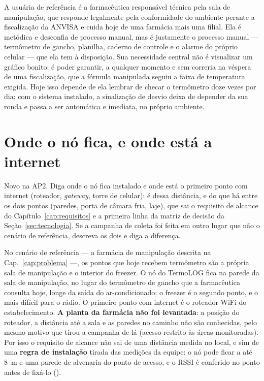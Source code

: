 A usuária de referência é a farmacêutica responsável técnica pela sala
de manipulação, que responde legalmente pela conformidade do ambiente
perante a fiscalização da ANVISA e cuida hoje de uma farmácia mais uma
filial. Ela é metódica e desconfia de processo manual, mas é justamente
o processo manual --- termômetro de gancho, planilha, caderno de
controle e o alarme do próprio celular --- que ela tem à disposição.
Sua necessidade central não é visualizar um gráfico bonito: é poder
garantir, a qualquer momento e sem correria na véspera de uma
fiscalização, que a fórmula manipulada seguiu a faixa de temperatura
exigida. Hoje isso depende de ela lembrar de checar o termômetro doze
vezes por dia; com o sistema instalado, a sinalização de desvio deixa
de depender da sua ronda e passa a ser automática e imediata, no
próprio ambiente.

\section{Onde o nó fica, e onde está a internet}
\label{sec:local}

\begin{orientacao}
Novo na AP2. Diga onde o nó fica instalado e onde está o primeiro ponto
com internet (roteador, \emph{gateway}, torre de celular): é dessa
distância, e do que há entre os dois pontos (paredes, porta de câmara
fria, laje), que sai o requisito de alcance do
Capítulo~\ref{cap:requisitos} e a primeira linha da matriz de decisão
da Seção~\ref{sec:tecnologia}. Se a campanha de coleta foi feita em
outro lugar que não o cenário de referência, descreva os dois e diga a
diferença.
\end{orientacao}

No cenário de referência --- a farmácia de manipulação descrita na
Cap.~\ref{cap:problema} ---, os pontos que hoje recebem termômetro são
a própria sala de manipulação e o interior do freezer. O nó do
TermoLOG fica na parede da sala de manipulação, no lugar do termômetro
de gancho que a farmacêutica consulta hoje, longe da saída do
ar-condicionado; o freezer é o segundo ponto, e o mais difícil para o
rádio. O primeiro ponto com internet é o roteador WiFi do
estabelecimento. \textbf{A planta da farmácia não foi levantada}: a
posição do roteador, a distância até a sala e as paredes no caminho não
são conhecidas, pelo mesmo motivo que tirou a campanha de lá (acesso
restrito às áreas monitoradas). Por isso o requisito de alcance não sai
de uma distância medida no local, e sim de uma \textbf{regra de
instalação} tirada das medições da equipe: o nó pode ficar a até
\SI{8}{\metre} e uma parede de alvenaria do ponto de acesso, e o RSSI é
conferido no ponto antes de fixá-lo ().

